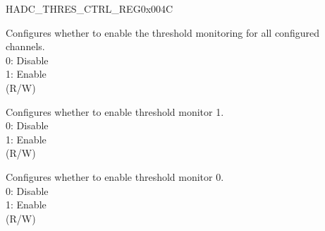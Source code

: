 \begin{register}{H}{ADC\_THRES\_CTRL\_REG}{0x004C}\label{regdesc:ADCTHRESCTRLREG}
%
%
%
%
%
\regnewline%
\begin{regdesc}\begin{reglist}
\label{fielddesc:ADCTHRESALLEN}\item [ADC\_THRES\_ALL\_EN] Configures whether to enable the threshold monitoring for all configured channels. \\
0: Disable\\
1: Enable\\
(R/W)
\label{fielddesc:ADCTHRES1EN}\item [ADC\_THRES1\_EN] Configures whether to enable threshold monitor 1. \\
0: Disable\\
1: Enable\\
(R/W)
\label{fielddesc:ADCTHRES0EN}\item [ADC\_THRES0\_EN] Configures whether to enable threshold monitor 0. \\
0: Disable\\
1: Enable\\
(R/W)
\end{reglist}\end{regdesc}
\end{register}


